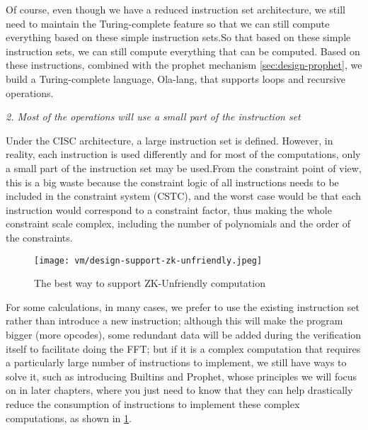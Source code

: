 Of course, even though we have a reduced instruction set architecture, we still need to maintain the Turing-complete feature so that
we can still compute everything based on these simple instruction sets.So that based on these simple instruction sets, we can still
compute everything that can be computed. Based on these instructions, combined with the prophet mechanism \ref{sec:design-prophet}, we build a Turing-complete
language, Ola-lang, that supports loops and recursive operations.

\emph{2. Most of the operations will use a small part of the instruction set}

Under the CISC architecture, a large instruction set is defined. However, in reality, each instruction is used differently and for most
of the computations, only a small part of the instruction set may be used.From the constraint point of view, this is a big waste because
the constraint logic of all instructions needs to be included in the constraint system (CSTC), and the worst case would be that each instruction
would correspond to a constraint factor, thus making the whole constraint scale complex, including the number of polynomials and the order of
the constraints.

\begin{figure}[!ht]
    \centering
    \texttt{[image: vm/design-support-zk-unfriendly.jpeg]}
    \caption{The best way to support ZK-Unfriendly computation}
    \label{fig:desgin-support-zk-unfriendly}
\end{figure}

For some calculations, in many cases, we prefer to use the existing instruction set rather than introduce a new instruction; 
although this will make the program bigger (more opcodes), some redundant data will be added during the verification itself to
facilitate doing the FFT; but if it is a complex computation that requires a particularly large number of instructions to implement, we still
have ways to solve it, such as introducing Builtins and Prophet, whose principles we will focus on in later chapters, where you just need to
know that they can help drastically reduce the consumption of instructions to implement these complex computations, as shown in \ref{fig:desgin-support-zk-unfriendly}.
